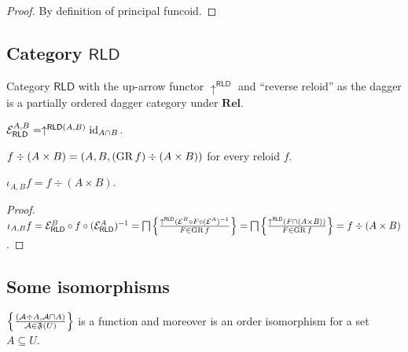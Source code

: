 \begin{proof}
  By definition of principal funcoid.
\end{proof}


\subsection{\texorpdfstring{Category $\mathsf{RLD}$}{Category RLD}}

Category $\mathsf{RLD}$ with the up-arrow functor
$\uparrow^{\mathsf{RLD}}$ and ``reverse reloid'' as the dagger is a
partially ordered dagger category under $\mathbf{Rel}$.

\begin{obvious}
$\mathcal{E}_{\mathsf{RLD}}^{A,B} = \uparrow^{\mathsf{RLD} (A ,
B)} \operatorname{id}_{A \cap B}$.
\end{obvious}

\begin{defn}
  $f \div (A \times B) = (A , B , (\operatorname{GR} f) \div (A \times B))$ for every
  reloid $f$.
\end{defn}

\begin{prop}
  $\iota_{A, B} f = f \div (A \times B)$.
\end{prop}

\begin{proof}
  $\iota_{A, B} f = \mathcal{E}_{\mathsf{RLD}}^{B}
\circ f \circ (\mathcal{E}_{\mathsf{RLD}}^{A})^{-1} =
\bigsqcap \left\{ \frac{ \uparrow^{\mathsf{RLD}} (\mathcal{E}^{B} \circ F \circ (\mathcal{E}^{A})^{-1}
}{ F \in \operatorname{GR} f }\right\} = \bigsqcap \left\{ \frac{
\uparrow^{\mathsf{RLD}} (F \cap (A \times B))}{F \in \operatorname{GR} f }\right\} = f \div (A \times B)$.

\end{proof}


\subsection{Some isomorphisms}

\begin{prop}
  $\left\{ \frac{ (\mathcal{A} \div A , \mathcal{A} \sqcap A) }{
  \mathcal{A} \in \mathfrak{F} (U) }\right\}$ is a function and
  moreover is an order isomorphism for a set $A \subseteq U$.
\end{prop}

